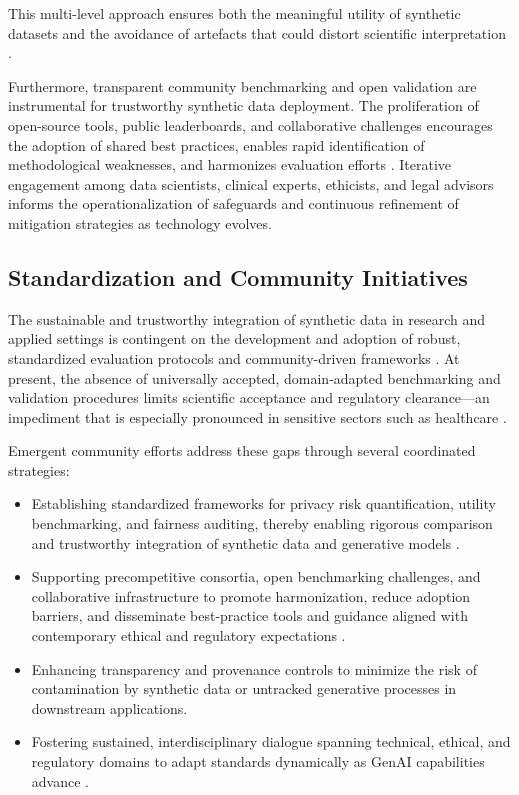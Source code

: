 This multi-level approach ensures both the meaningful utility of synthetic datasets and the avoidance of artefacts that could distort scientific interpretation \cite{ref6}\cite{ref11}\cite{ref75}\cite{ref81}\cite{ref89}.

Furthermore, transparent community benchmarking and open validation are instrumental for trustworthy synthetic data deployment. The proliferation of open-source tools, public leaderboards, and collaborative challenges encourages the adoption of shared best practices, enables rapid identification of methodological weaknesses, and harmonizes evaluation efforts \cite{ref82}\cite{ref88}\cite{ref89}. Iterative engagement among data scientists, clinical experts, ethicists, and legal advisors informs the operationalization of safeguards and continuous refinement of mitigation strategies as technology evolves.

\subsection{Standardization and Community Initiatives}

The sustainable and trustworthy integration of synthetic data in research and applied settings is contingent on the development and adoption of robust, standardized evaluation protocols and community-driven frameworks \cite{ref88}\cite{ref89}. At present, the absence of universally accepted, domain-adapted benchmarking and validation procedures limits scientific acceptance and regulatory clearance—an impediment that is especially pronounced in sensitive sectors such as healthcare \cite{ref6}\cite{ref7}\cite{ref88}\cite{ref89}.

Emergent community efforts address these gaps through several coordinated strategies:

\begin{itemize}
    \item Establishing standardized frameworks for privacy risk quantification, utility benchmarking, and fairness auditing, thereby enabling rigorous comparison and trustworthy integration of synthetic data and generative models \cite{ref81}\cite{ref82}\cite{ref88}\cite{ref89}.
    \item Supporting precompetitive consortia, open benchmarking challenges, and collaborative infrastructure to promote harmonization, reduce adoption barriers, and disseminate best-practice tools and guidance aligned with contemporary ethical and regulatory expectations \cite{ref89}.
    \item Enhancing transparency and provenance controls to minimize the risk of contamination by synthetic data or untracked generative processes in downstream applications.
    \item Fostering sustained, interdisciplinary dialogue spanning technical, ethical, and regulatory domains to adapt standards dynamically as GenAI capabilities advance \cite{ref60}\cite{ref75}\cite{ref81}\cite{ref88}.
\end{itemize}

